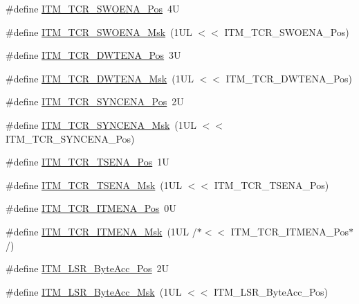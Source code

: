 \begin{DoxyCompactItemize}
\item 
\#define \mbox{\hyperlink{group___c_m_s_i_s___i_t_m_ga7a380f0c8078f6560051406583ecd6a5}{I\+T\+M\+\_\+\+T\+C\+R\+\_\+\+S\+W\+O\+E\+N\+A\+\_\+\+Pos}}~4U
\item 
\#define \mbox{\hyperlink{group___c_m_s_i_s___i_t_m_ga97476cb65bab16a328b35f81fd02010a}{I\+T\+M\+\_\+\+T\+C\+R\+\_\+\+S\+W\+O\+E\+N\+A\+\_\+\+Msk}}~(1\+U\+L $<$$<$ I\+T\+M\+\_\+\+T\+C\+R\+\_\+\+S\+W\+O\+E\+N\+A\+\_\+\+Pos)
\item 
\#define \mbox{\hyperlink{group___c_m_s_i_s___i_t_m_ga30e83ebb33aa766070fe3d1f27ae820e}{I\+T\+M\+\_\+\+T\+C\+R\+\_\+\+D\+W\+T\+E\+N\+A\+\_\+\+Pos}}~3U
\item 
\#define \mbox{\hyperlink{group___c_m_s_i_s___i_t_m_ga98ea1c596d43d3633a202f9ee746cf70}{I\+T\+M\+\_\+\+T\+C\+R\+\_\+\+D\+W\+T\+E\+N\+A\+\_\+\+Msk}}~(1\+U\+L $<$$<$ I\+T\+M\+\_\+\+T\+C\+R\+\_\+\+D\+W\+T\+E\+N\+A\+\_\+\+Pos)
\item 
\#define \mbox{\hyperlink{group___c_m_s_i_s___i_t_m_gaa93a1147a39fc63980d299231252a30e}{I\+T\+M\+\_\+\+T\+C\+R\+\_\+\+S\+Y\+N\+C\+E\+N\+A\+\_\+\+Pos}}~2U
\item 
\#define \mbox{\hyperlink{group___c_m_s_i_s___i_t_m_gac89b74a78701c25b442105d7fe2bbefb}{I\+T\+M\+\_\+\+T\+C\+R\+\_\+\+S\+Y\+N\+C\+E\+N\+A\+\_\+\+Msk}}~(1\+U\+L $<$$<$ I\+T\+M\+\_\+\+T\+C\+R\+\_\+\+S\+Y\+N\+C\+E\+N\+A\+\_\+\+Pos)
\item 
\#define \mbox{\hyperlink{group___c_m_s_i_s___i_t_m_ga5aa381845f810114ab519b90753922a1}{I\+T\+M\+\_\+\+T\+C\+R\+\_\+\+T\+S\+E\+N\+A\+\_\+\+Pos}}~1U
\item 
\#define \mbox{\hyperlink{group___c_m_s_i_s___i_t_m_ga436b2e8fa24328f48f2da31c00fc9e65}{I\+T\+M\+\_\+\+T\+C\+R\+\_\+\+T\+S\+E\+N\+A\+\_\+\+Msk}}~(1\+U\+L $<$$<$ I\+T\+M\+\_\+\+T\+C\+R\+\_\+\+T\+S\+E\+N\+A\+\_\+\+Pos)
\item 
\#define \mbox{\hyperlink{group___c_m_s_i_s___i_t_m_ga3286b86004bce7ffe17ee269f87f8d9d}{I\+T\+M\+\_\+\+T\+C\+R\+\_\+\+I\+T\+M\+E\+N\+A\+\_\+\+Pos}}~0U
\item 
\#define \mbox{\hyperlink{group___c_m_s_i_s___i_t_m_ga7dd53e3bff24ac09d94e61cb595cb2d9}{I\+T\+M\+\_\+\+T\+C\+R\+\_\+\+I\+T\+M\+E\+N\+A\+\_\+\+Msk}}~(1\+U\+L /$\ast$$<$$<$ I\+T\+M\+\_\+\+T\+C\+R\+\_\+\+I\+T\+M\+E\+N\+A\+\_\+\+Pos$\ast$/)
\item 
\#define \mbox{\hyperlink{group___c_m_s_i_s___i_t_m_gabfae3e570edc8759597311ed6dfb478e}{I\+T\+M\+\_\+\+L\+S\+R\+\_\+\+Byte\+Acc\+\_\+\+Pos}}~2U
\item 
\#define \mbox{\hyperlink{group___c_m_s_i_s___i_t_m_ga91f492b2891bb8b7eac5b58de7b220f4}{I\+T\+M\+\_\+\+L\+S\+R\+\_\+\+Byte\+Acc\+\_\+\+Msk}}~(1\+U\+L $<$$<$ I\+T\+M\+\_\+\+L\+S\+R\+\_\+\+Byte\+Acc\+\_\+\+Pos)
$$
\end{DoxyCompactItemize}
